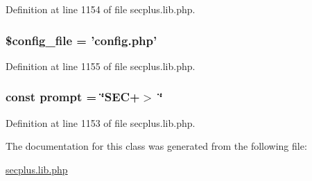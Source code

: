Definition at line 1154 of file secplus.lib.php.

\hypertarget{class_sec_plus_1_1_shell_ae6059ea82d657151d1d5b4f5c5ef9177}{
\subsubsection[{\$config\_\-file}]{\setlength{\rightskip}{0pt plus 5cm}\$config\_\-file = 'config.php'}}
\label{class_sec_plus_1_1_shell_ae6059ea82d657151d1d5b4f5c5ef9177}


Definition at line 1155 of file secplus.lib.php.

\hypertarget{class_sec_plus_1_1_shell_aa58105470d0307085c38e19ee0a97975}{
\subsubsection[{prompt}]{\setlength{\rightskip}{0pt plus 5cm}const {\bf prompt} = \char`\"{}SEC+$>$ \char`\"{}}}
\label{class_sec_plus_1_1_shell_aa58105470d0307085c38e19ee0a97975}


Definition at line 1153 of file secplus.lib.php.



The documentation for this class was generated from the following file:\begin{DoxyCompactItemize}
\item 
\hyperlink{secplus_8lib_8php}{secplus.lib.php}\end{DoxyCompactItemize}
